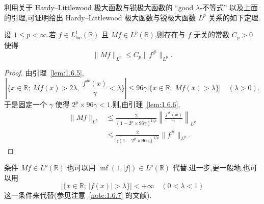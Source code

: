 利用关于 Hardy--Littlewood 极大函数与锐极大函数的 ``good $\lambda$-不等式'' 以及上面的引理,可证明给出 Hardy--Littlewood 极大函数与锐极大函数 $L^{p}$ 关系的如下定理.

\begin{theorem}\label{thm:1.6.8}
设 $1 \leq p < \infty$.若 $f \in L_{\mathrm{loc}}^{1}(\mathbb{R})$ 且 $Mf \in L^{p}(\mathbb{R})$,则存在与 $f$ 无关的常数 $C_{p} > 0$ 使得
\begin{equation*}
\| Mf \|_{L^{p}} \leq C_{p}\| f^{\#} \|_{L^{p}}.
\end{equation*}
\end{theorem}

\begin{proof}
由引理~\ref{lem:1.6.5},
\begin{equation*}
|\{x \in \mathbb{R};\ Mf(x) > 2\lambda,\ \frac{f^{\#}(x)}{\gamma} < \lambda\}| \leq 96\gamma|\{x \in \mathbb{R};\ Mf(x) > \lambda\}| \quad (\lambda > 0).
\end{equation*}
于是固定一个 $\gamma$ 使得 $2^{p} \times 96\gamma < 1$.则,由引理~\ref{lem:1.6.6},
\begin{align*}
\| Mf \|_{L^{p}} & \leq \frac{2}{(1 - 2^{p} \times 96\gamma)^{1/p}}\left\| \frac{f^{\#}(x)}{\gamma} \right\|_{L^{p}} \\
& \leq \frac{2}{\gamma(1 - 2^{p} \times 96\gamma)^{1/p}}\| f^{\#} \|_{L^{p}}.
\end{align*}
\end{proof}

\begin{note}\label{note:1.6.9}
条件 $Mf \in L^{p}(\mathbb{R})$ 也可以用 $\inf(1, |f|) \in L^{p}(\mathbb{R})$ 代替.进一步,更一般地,也可以用
\begin{equation*}
|\{x \in \mathbb{R};\ |f(x)| > \lambda\}| < +\infty \quad (0 < \lambda < 1)
\end{equation*}
这一条件来代替(参见注意~\ref{note:1.6.7} 的文献).
\end{note}
